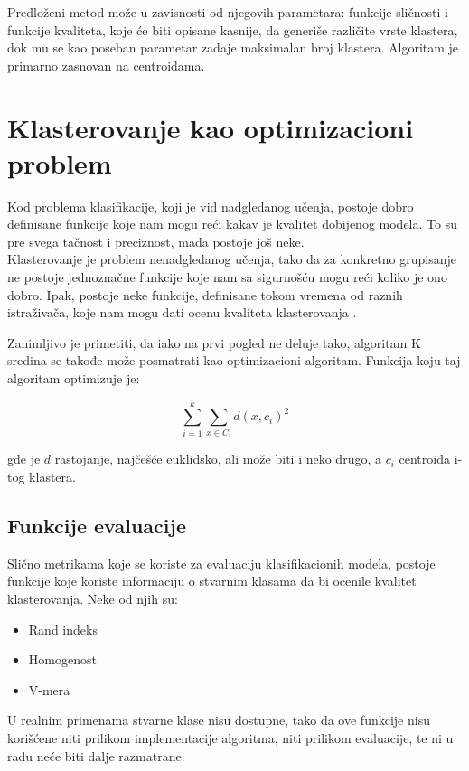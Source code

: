 \documentclass[a4paper, twocolumn]{article}
\begin{document}
{Predloženi metod može u zavisnosti od njegovih parametara: funkcije sličnosti i funkcije kvaliteta, koje će biti opisane kasnije, da generiše različite vrste klastera, dok mu se kao poseban parametar zadaje maksimalan broj klastera.
Algoritam je primarno zasnovan na centroidama.

\section{Klasterovanje kao optimizacioni problem}
\label{sec:klasterovanje}
Kod problema klasifikacije, koji je vid nadgledanog učenja, postoje dobro definisane funkcije koje nam mogu reći kakav je kvalitet dobijenog modela. To su pre svega tačnost i preciznost, mada postoje još neke.\\

Klasterovanje je problem nenadgledanog učenja,
 tako da za konkretno grupisanje ne postoje jednoznačne funkcije koje nam sa sigurnošću mogu reći koliko je ono dobro. Ipak, postoje neke funkcije, definisane tokom vremena od raznih istraživača, koje nam mogu dati ocenu kvaliteta klasterovanja \cite{dunn}\cite{ch_score}.

Zanimljivo je primetiti, da iako na prvi pogled ne deluje tako, algoritam K sredina se takođe može posmatrati kao optimizacioni algoritam. Funkcija koju taj algoritam optimizuje je:

\[ \sum_{i=1}^{k}\sum_{x \in C_i} d(x, c_i)^2 \]

gde je $d$ rastojanje, najčešće euklidsko, ali može biti i neko drugo, a $c_i$ centroida i-tog klastera. 
\subsection{Funkcije evaluacije}
Slično metrikama koje se koriste za evaluaciju klasifikacionih modela, postoje funkcije koje koriste informaciju o stvarnim klasama da bi ocenile kvalitet klasterovanja. Neke od njih su:
\begin{itemize}
	\item Rand indeks
	\item Homogenost
	\item V-mera
\end{itemize}  

U realnim primenama stvarne klase nisu dostupne, tako da ove funkcije nisu korišćene niti prilikom implementacije algoritma, niti prilikom evaluacije, te ni u radu neće biti dalje razmatrane.\\

}
\end{document}
